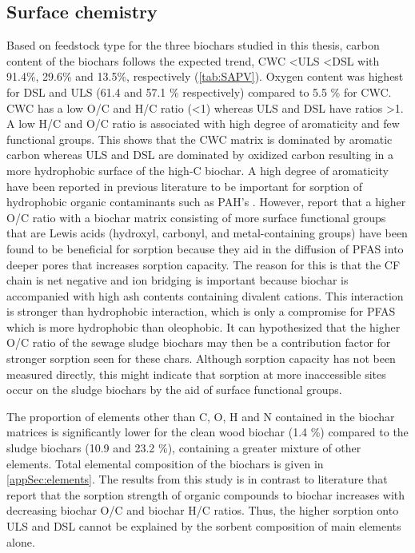 \subsection{Surface chemistry}
Based on feedstock type for the three biochars studied in this thesis, carbon content of the biochars follows the expected trend, CWC \textless ULS \textless DSL with 91.4\%, 29.6\% and 13.5\%, respectively (\cref{tab:SAPV}). Oxygen content was highest for DSL and ULS (61.4 and 57.1 \% respectively) compared to 5.5 \% for CWC. CWC has a low O/C and H/C ratio (\textless 1) whereas ULS and DSL have ratios \textgreater 1. A low H/C and O/C ratio is associated with high degree of aromaticity and few functional groups. This shows that the CWC matrix is dominated by aromatic carbon whereas ULS and DSL are dominated by oxidized carbon resulting in a more hydrophobic surface of the high-C biochar. A high degree of aromaticity have been reported in previous literature to be important for sorption of hydrophobic organic contaminants such as PAH's \citep{Cornelissen2005}. However, \cite{du2014adsorption} report that a higher O/C ratio with a biochar matrix consisting of more surface functional groups that are Lewis acids (hydroxyl, carbonyl, and metal-containing groups) have been found to be beneficial for sorption because they aid in the diffusion of PFAS into deeper pores that increases sorption capacity. The reason for this is that the CF chain is net negative and ion bridging is important because biochar is accompanied with high ash contents containing divalent cations. This interaction is stronger than hydrophobic interaction, which is only a compromise for PFAS which is more hydrophobic than oleophobic. It can hypothesized that the higher O/C ratio of the sewage sludge biochars may then be a contribution factor for stronger sorption seen for these chars. Although sorption capacity has not been measured directly, this might indicate that sorption at more inaccessible sites occur on the sludge biochars by the aid of surface functional groups. 

The proportion of elements other than C, O, H and N contained in the biochar matrices is significantly lower for the clean wood biochar (1.4 \%) compared to the sludge biochars (10.9 and 23.2 \%), containing a greater mixture of other elements. Total elemental composition of the biochars is given in \cref{appSec:elements}. The results from this study is in contrast to literature \citep{Hale2016,Sormo2021,zhang2021sorption} that report that the sorption strength of organic compounds to biochar increases with decreasing biochar O/C and biochar H/C ratios. Thus, the higher sorption onto ULS and DSL cannot be explained by the sorbent composition of main elements alone.

